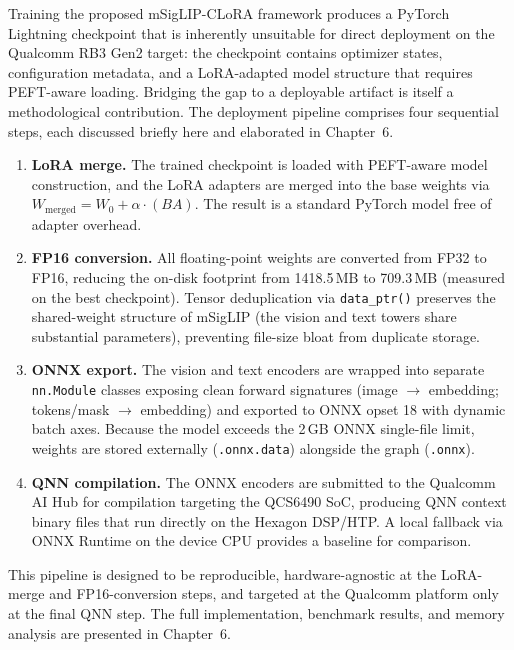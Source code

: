 \documentclass[../main.tex]{subfiles}
\begin{document}
\noindent Training the proposed mSigLIP-CLoRA framework produces a PyTorch Lightning checkpoint that is inherently unsuitable for direct deployment on the Qualcomm RB3 Gen2 target: the checkpoint contains optimizer states, configuration metadata, and a LoRA-adapted model structure that requires PEFT-aware loading. Bridging the gap to a deployable artifact is itself a methodological contribution. The deployment pipeline comprises four sequential steps, each discussed briefly here and elaborated in Chapter~6.

\begin{enumerate}
    \item \textbf{LoRA merge.} The trained checkpoint is loaded with PEFT-aware model construction, and the LoRA adapters are merged into the base weights via $W_{\text{merged}} = W_0 + \alpha \cdot (BA)$. The result is a standard PyTorch model free of adapter overhead.
    \item \textbf{FP16 conversion.} All floating-point weights are converted from FP32 to FP16, reducing the on-disk footprint from 1418.5\,MB to 709.3\,MB (measured on the best checkpoint). Tensor deduplication via \texttt{data\_ptr()} preserves the shared-weight structure of mSigLIP (the vision and text towers share substantial parameters), preventing file-size bloat from duplicate storage.
    \item \textbf{ONNX export.} The vision and text encoders are wrapped into separate \texttt{nn.Module} classes exposing clean forward signatures (image $\to$ embedding; tokens/mask $\to$ embedding) and exported to ONNX opset 18 with dynamic batch axes. Because the model exceeds the 2\,GB ONNX single-file limit, weights are stored externally (\texttt{.onnx.data}) alongside the graph (\texttt{.onnx}).
    \item \textbf{QNN compilation.} The ONNX encoders are submitted to the Qualcomm AI Hub for compilation targeting the QCS6490 SoC, producing QNN context binary files that run directly on the Hexagon DSP/HTP. A local fallback via ONNX Runtime on the device CPU provides a baseline for comparison.
\end{enumerate}

\noindent This pipeline is designed to be reproducible, hardware-agnostic at the LoRA-merge and FP16-conversion steps, and targeted at the Qualcomm platform only at the final QNN step. The full implementation, benchmark results, and memory analysis are presented in Chapter~6.
\end{document}
